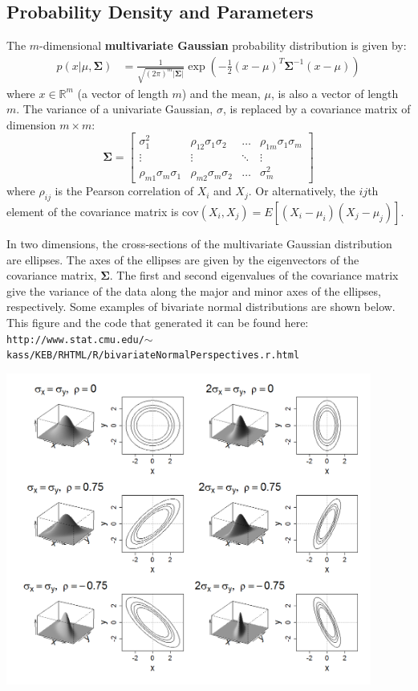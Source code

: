 \subsection{Probability Density and Parameters}

The $m$-dimensional \textbf{multivariate Gaussian} probability distribution is given by:
\begin{align*} p(x | \mu, \boldsymbol\Sigma)
&= \frac{1}{\sqrt{(2\pi)^m|\boldsymbol\Sigma|}}
\exp\left(-\frac{1}{2}({x}-{\mu})^T{\boldsymbol\Sigma}^{-1}({x}-{\mu})
\right) \end{align*}
where $x \in \mathbb{R}^m$ (a vector of length $m$) and the mean, $\mu$, is also a vector of length $m$. The variance of a univariate Gaussian, $\sigma$, is replaced by a covariance matrix of dimension $m \times m$:
$$ \boldsymbol\Sigma = \begin{bmatrix} \sigma_1^2 & \rho_{12}\sigma_1 \sigma_2 & \dots & \rho_{1m}\sigma_1 \sigma_m \\
\vdots & \vdots & \ddots & \vdots \\
\rho_{m1}\sigma_m \sigma_1 & \rho_{m2}\sigma_m \sigma_2 & \dots & \sigma_m^2 \end{bmatrix} $$
where $\rho_{ij}$ is the Pearson correlation of $X_i$ and $X_j$. Or alternatively, the $ij$th element of the covariance matrix is $\text{cov}(X_i, X_j) = E\left[ (X_i - \mu_i)(X_j - \mu_j) \right]$.

In two dimensions, the cross-sections of the multivariate Gaussian distribution are ellipses. The axes of the ellipses are given by the eigenvectors of the covariance matrix, $\boldsymbol\Sigma$. The first and second eigenvalues of the covariance matrix give the variance of the data along the major and minor axes of the ellipses, respectively. Some examples of bivariate normal distributions are shown below. This figure and the code that generated it can be found here:
\texttt{\small http://www.stat.cmu.edu/$\sim$kass/KEB/RHTML/R/bivariateNormalPerspectives.r.html}

\begin{center}
\includegraphics[width=0.9\textwidth]{img/bivariateNormalRev.png}
\end{center}

